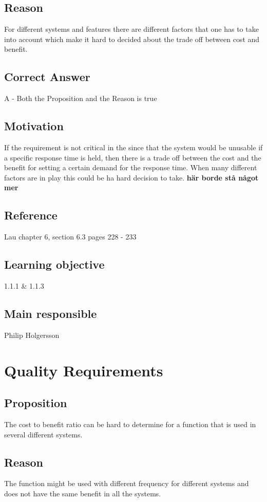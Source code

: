 \documentclass[a4paper]{article}
\begin{document}
\subsection*{Reason}
For different systems and features there are different factors that one has to take into account which make it hard to decided about the trade off between cost and benefit.
\subsection*{Correct Answer}
A - Both the Proposition and the Reason is true
\subsection*{Motivation}
If the requirement is not critical in the since that the system would be unusable if a specific response time is held, then there is a trade off between the cost and the benefit for setting a certain demand for the response time. When many different factors are in play this could be ha hard decision to take. \textbf{här borde stå något mer}
\subsection*{Reference}
Lau chapter 6, section 6.3 pages 228 - 233
\subsection*{Learning objective}
1.1.1 \& 1.1.3
\subsection*{Main responsible}
Philip Holgersson

\section{Quality Requirements}
\subsection*{Proposition}
The cost to benefit ratio can be hard to determine for a function that is used in several different systems.
\subsection*{Reason}
The function might be used with different frequency for different systems and does not have the same benefit in all the systems.
\end{document}
